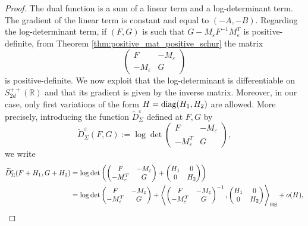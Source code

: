 \documentclass[]{article}
\def\diag{\mathop{\rm diag}\nolimits}
\numberwithin{equation}{section}
\theoremstyle{plain}
\begin{document}
{\begin{proof}
	The dual function is a sum of a linear term and a log-determinant term. The gradient of the linear term is constant and equal to $(-A,-B)$. Regarding the log-determinant term, if $(F,G)$ is such that $G-M_\varepsilon F^{-1} M_\varepsilon^{T}$ is positive-definite, from Theorem \ref{thm:positive_mat_positive_schur} the matrix 
	\begin{equation}
		\begin{pmatrix}
			F & -M_{\varepsilon} \\
			-M_{\varepsilon} & G
		\end{pmatrix}
	\end{equation}
	is positive-definite. We now exploit that the log-determinant is differentiable on $S_{2d}^{++}(\mathbb{R})$ and that its gradient is given by the inverse matrix. Moreover, in our case, only first variations of the form $H = \diag(H_1,H_2)$ are allowed. More precisely, introducing the function $\widetilde{D}_{\Sigma}^{\varepsilon}$ defined at $F,G$ by 
	\begin{equation}
		\widetilde{D}_{\Sigma}^{\varepsilon}(F,G) := \log \det  \begin{pmatrix}
			F & -M_{\varepsilon}\\
			-M_{\varepsilon}^T& G
		\end{pmatrix},
	\end{equation}
	we write
	\begin{align*}
		\widetilde{D}_{\Sigma}^{\varepsilon}(F + H_1,G + H_2) & =  \log \det \left(   \begin{pmatrix}
			F & -M_{\varepsilon}\\
			-M_{\varepsilon}^T& G
		\end{pmatrix} +  \begin{pmatrix}
			H_1 & 0\\
			0 & H_2
		\end{pmatrix} \right)\\
		& = \log \det  \begin{pmatrix}
			F & -M_{\varepsilon}\\
			-M_{\varepsilon}^T& G
		\end{pmatrix} + \left \langle \begin{pmatrix}
			F & -M_{\varepsilon}\\
			-M_{\varepsilon}^T& G
		\end{pmatrix}^{-1} ,   \begin{pmatrix}
			H_1 & 0\\
			0 & H_2
		\end{pmatrix} \right \rangle_{\rm HS} + o(H),

\end{align*}
\end{proof}}
\end{document}
